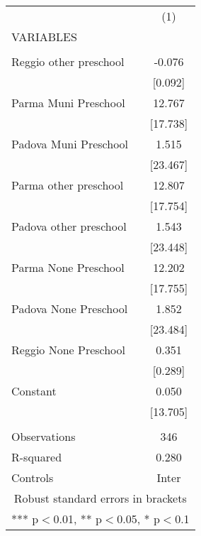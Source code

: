 \begin{tabular}{lc} \hline
 & (1) \\
VARIABLES &  \\ \hline
 &  \\
Reggio other preschool & -0.076 \\
 & [0.092] \\
Parma Muni Preschool & 12.767 \\
 & [17.738] \\
Padova Muni Preschool & 1.515 \\
 & [23.467] \\
Parma other preschool & 12.807 \\
 & [17.754] \\
Padova other preschool & 1.543 \\
 & [23.448] \\
Parma None Preschool & 12.202 \\
 & [17.755] \\
Padova None Preschool & 1.852 \\
 & [23.484] \\
Reggio None Preschool & 0.351 \\
 & [0.289] \\
Constant & 0.050 \\
 & [13.705] \\
 &  \\
Observations & 346 \\
R-squared & 0.280 \\
 Controls & Inter \\ \hline
\multicolumn{2}{c}{ Robust standard errors in brackets} \\
\multicolumn{2}{c}{ *** p$<$0.01, ** p$<$0.05, * p$<$0.1} \\
\end{tabular}
